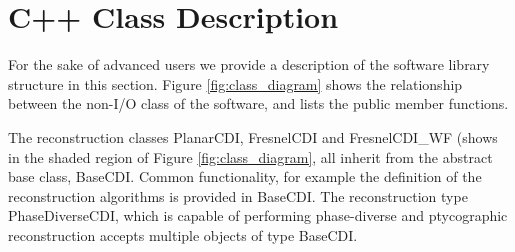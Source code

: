 \documentclass[]{cxs-software}
\begin{document}

\newpage

\appendix

\section{C++ Class Description} 

For the sake of advanced users we provide a description of the
software library structure in this section. Figure
\ref{fig:class_diagram} shows the relationship between the non-I/O
class of the software, and lists the public member functions.

The reconstruction classes PlanarCDI, FresnelCDI and FresnelCDI\_WF
(shows in the shaded region of Figure \ref{fig:class_diagram}, all
inherit from the abstract base class, BaseCDI. Common functionality,
for example the definition of the reconstruction algorithms is
provided in BaseCDI. The reconstruction type PhaseDiverseCDI, which is
capable of performing phase-diverse and ptycographic reconstruction
accepts multiple objects of type BaseCDI.
\end{document}
